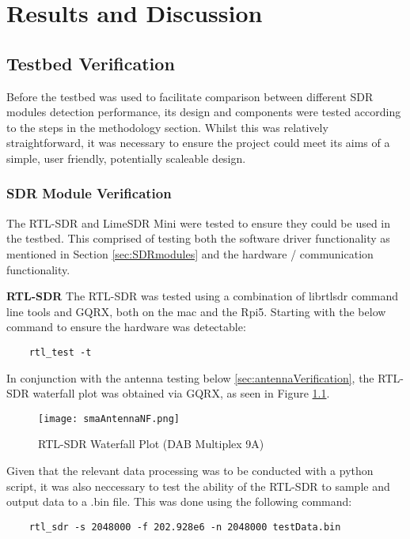 \chapter{Results and Discussion \label{sec:results}}

\section{Testbed Verification \label{sec:testbedResults}}
Before the testbed was used to facilitate comparison between different SDR modules detection performance, its design and components were tested according to the steps in the methodology section. Whilst this was relatively straightforward, it was necessary to ensure the project could meet its aims of a simple, user friendly, potentially scaleable design. 

\subsection{SDR Module Verification \label{sec:sdrVerification}}
The RTL-SDR and LimeSDR Mini were tested to ensure they could be used in the testbed. This comprised of testing both the software driver functionality as mentioned in Section \ref{sec:SDRmodules} and the hardware / communication functionality. 
\par \vspace{0.5cm}
\noindent
\textbf{RTL-SDR}
The RTL-SDR was tested using a combination of librtlsdr command line tools and GQRX, both on the mac and the Rpi5. Starting with the below command to ensure the hardware was detectable:

\begin{verbatim}
    rtl_test -t
\end{verbatim}

\noindent 
In conjunction with the antenna testing below \ref{sec:antennaVerification}, the RTL-SDR waterfall plot was obtained via GQRX, as seen in Figure \ref{fig:rtlSDRwaterfall}.

\begin{figure}[h!]
    \centering
    \texttt{[image: smaAntennaNF.png]}
    \caption{RTL-SDR Waterfall Plot (DAB Multiplex 9A)}
    \label{fig:rtlSDRwaterfall}
\end{figure}

Given that the relevant data processing was to be conducted with a python script, it was also neccessary to test the ability of the RTL-SDR to sample and output data to a .bin file. This was done using the following command:
\begin{verbatim}
    rtl_sdr -s 2048000 -f 202.928e6 -n 2048000 testData.bin 
\end{verbatim}

